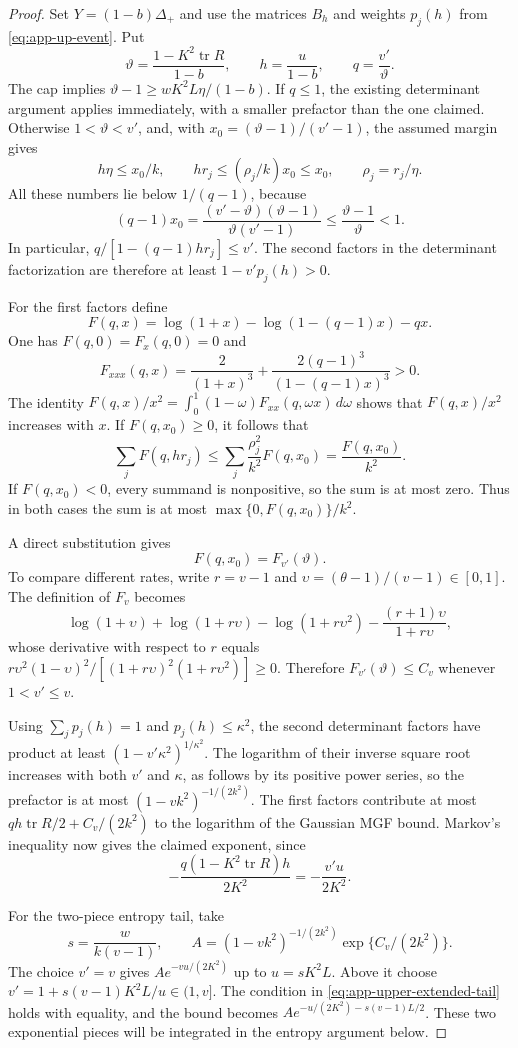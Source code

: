 \documentclass[11pt,a4paper]{article}
\numberwithin{equation}{section}
\begin{document}
\begin{proof}
Set $Y=(1-b)\Delta_+$ and use the matrices $B_h$ and weights $p_j(h)$
from \eqref{eq:app-up-event}. Put
\[
 \vartheta=\frac{1-K^2\operatorname{tr}R}{1-b},\qquad
 h=\frac{u}{1-b},\qquad q=\frac{v'}{\vartheta}.
\]
The cap implies
$\vartheta-1\ge wK^2L\eta/(1-b)$.
If $q\le1$, the existing determinant argument applies immediately,
with a smaller prefactor than the one claimed.
Otherwise $1<\vartheta<v'$, and, with
$x_0=(\vartheta-1)/(v'-1)$, the assumed margin gives
\[
 h\eta\le x_0/k,\qquad hr_j\le(\rho_j/k)x_0\le x_0,
 \qquad \rho_j=r_j/\eta.
\]
All these numbers lie below $1/(q-1)$, because
\[
 (q-1)x_0
 =\frac{(v'-\vartheta)(\vartheta-1)}{\vartheta(v'-1)}
 \le\frac{\vartheta-1}{\vartheta}<1.
\]
In particular,
$q/[1-(q-1)hr_j]\le v'$.
The second factors in the determinant factorization are therefore
at least $1-v'p_j(h)>0$.

For the first factors define
\[
 F(q,x)=\log(1+x)-\log(1-(q-1)x)-qx.
\]
One has $F(q,0)=F_x(q,0)=0$ and
\[
 F_{xxx}(q,x)=\frac2{(1+x)^3}
          +\frac{2(q-1)^3}{(1-(q-1)x)^3}>0.
\]
The identity
$F(q,x)/x^2=\int_0^1(1-\omega)F_{xx}(q,\omega x)\,d\omega$
shows that $F(q,x)/x^2$ increases with $x$.
If $F(q,x_0)\ge0$, it follows that
\[
 \sum_jF(q,hr_j)
 \le\sum_j\frac{\rho_j^2}{k^2}F(q,x_0)
 =\frac{F(q,x_0)}{k^2}.
\]
If $F(q,x_0)<0$, every summand is nonpositive, so the sum is at most zero.
Thus in both cases the sum is at most
$\max\{0,F(q,x_0)\}/k^2$.

A direct substitution gives
\[
 F(q,x_0)=F_{v'}(\vartheta).
\]
To compare different rates, write $r=v-1$ and
$\upsilon=(\theta-1)/(v-1)\in[0,1]$. The definition of $F_v$ becomes
\[
 \log(1+\upsilon)+\log(1+r\upsilon)-\log(1+r\upsilon^2)
                    -\frac{(r+1)\upsilon}{1+r\upsilon},
\]
whose derivative with respect to $r$ equals
$r\upsilon^2(1-\upsilon)^2/[(1+r\upsilon)^2(1+r\upsilon^2)]\ge0$.
Therefore $F_{v'}(\vartheta)\le C_v$ whenever $1<v'\le v$.

Using $\sum_jp_j(h)=1$ and $p_j(h)\le\kappa^2$, the second determinant
factors have product at least $(1-v'\kappa^2)^{1/\kappa^2}$.
The logarithm of their inverse square root increases with both $v'$ and
$\kappa$, as follows by its positive power series, so the prefactor
is at most $(1-vk^2)^{-1/(2k^2)}$.
The first factors contribute at most
$qh\operatorname{tr}R/2+C_v/(2k^2)$ to the logarithm of the Gaussian
MGF bound. Markov's inequality now gives the claimed exponent, since
\[
 -\frac{q(1-K^2\operatorname{tr}R)h}{2K^2}
 =-\frac{v'u}{2K^2}.
\]

For the two-piece entropy tail, take
\[
 s=\frac{w}{k(v-1)},\qquad
 A=(1-vk^2)^{-1/(2k^2)}\exp\{C_v/(2k^2)\}.
\]
The choice $v'=v$ gives $Ae^{-vu/(2K^2)}$ up to $u=sK^2L$.
Above it choose $v'=1+s(v-1)K^2L/u\in(1,v]$.
The condition in \eqref{eq:app-upper-extended-tail} holds with equality,
and the bound becomes
$Ae^{-u/(2K^2)-s(v-1)L/2}$.
These two exponential pieces will be integrated in the entropy argument below.
\end{proof}
\end{document}

